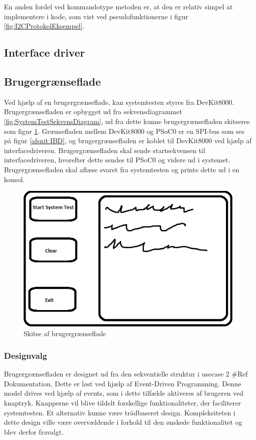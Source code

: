En anden fordel ved kommandotype metoden er, at den er relativ simpel at implementere i kode, som vist ved pseudofunktionerne i figur \ref{fig:I2CProtokolEksempel}.


\subsection{Interface driver}




\subsection{Brugergrænseflade}
Ved hjælp af en brugergrænseflade, kan systemtesten styres fra DevKit8000.
Brugergrænsefladen er opbygget ud fra sekvensdiagrammet \ref{fig:SystemTestSekvensDiagram},
ud fra dette kunne brugergrænsefladen skitseres som figur \ref{fig:GUISkitse}.
Grænsefladen mellem DevKit8000 og PSoC0 er en SPI-bus som ses på figur \ref{afsnit:IBD}, og brugergrænsefladen er koblet til DevKit8000 ved hjælp af interfacedriveren.
Brugergrænsefladen skal sende startsekvensen til interfacedriveren, hvorefter dette sendes til PSoC0 og videre ud i systemet.
Brugergrænsefladen skal aflæse svaret fra systemtesten og printe dette ud i en konsol.

\begin{figure}[H]
	\centering
	\includegraphics[width=\textwidth] {Systemarkitektur/images/GUISkitse}
	\caption{Skitse af brugergrænseflade}
	\label{fig:GUISkitse}
\end{figure}

\subsubsection{Designvalg}
Brugergrænsefladen er designet ud fra den sekventielle struktur i usecase 2 \#Ref Dokumentation. Dette er løst ved hjælp af Event-Driven Programming.
Denne model drives ved hjælp af events, som i dette tilfælde aktiveres af brugeren ved knaptryk. Knapperne vil blive tildelt forskellige funktionaliteter, der faciliterer systemtesten.
Et alternativ kunne være trådbaseret design. Kompleksiteten i dette design ville være overvældende i forhold til den ønskede funktionalitet og blev derfor fravalgt.